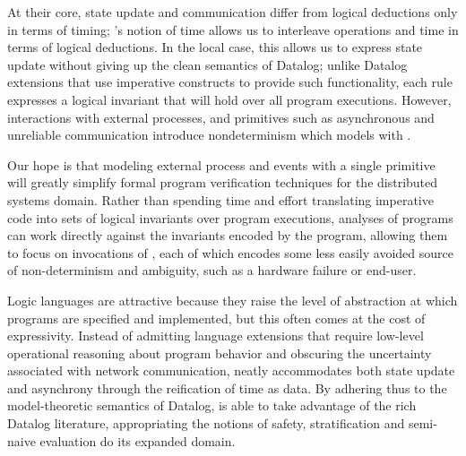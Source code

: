 
At their core, state update and communication differ from logical
deductions only in terms of timing; \lang's notion of time allows us
to interleave operations and time in terms of logical deductions.
In the local case, this allows us to express state update without giving up the clean semantics of Datalog; unlike
Datalog extensions that use imperative constructs to provide such
functionality, each \lang rule expresses a logical invariant that will
hold over all program executions.  
However, interactions with external processes, and primitives such as
asynchronous and unreliable communication introduce nondeterminism
which \lang models with .  

Our hope is that modeling external process and events with a single
primitive will greatly simplify formal program verification techniques for the distributed systems domain.  Rather
than spending time and effort translating imperative code into sets of logical
invariants over program executions, analyses of \lang programs can
work directly against the invariants encoded by the program, allowing
them to focus on invocations of , each of which
encodes some less easily avoided source of non-determinism and
ambiguity, such as a hardware failure or end-user.

Logic languages are attractive because they raise the level of abstraction at which programs are specified
and implemented, but this often comes at the cost of expressivity.  Instead of admitting language extensions that require low-level 
operational reasoning about program behavior and obscuring the uncertainty associated with network communication, \lang 
neatly accommodates both state update and asynchrony through the reification of time as data.  By adhering thus to the model-theoretic
semantics of Datalog, \lang is able to take advantage of the rich Datalog literature, appropriating the notions of safety, stratification
and semi-naive evaluation do its expanded domain.  




